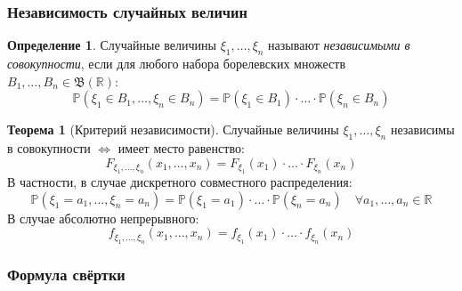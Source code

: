 \documentclass[oneside,final,14pt]{extreport}
\theoremstyle{plain}
\theoremstyle{definition}
\newtheorem*{defn}{Определение}
\theoremstyle{named}
\newtheorem*{namedthm}{Теорема}
\begin{document}
\subsubsection{Независимость случайных величин}
\begin{defn}
    Случайные величины $\xi_1, \ldots, \xi_n$ называют {\it независимыми в совокупности}, если для любого набора борелевских множеств $B_{1}, \ldots, B_{n} \in \mathfrak{B}(\mathbb{R})$:
    \begin{equation*}
        \mathbb{P}\left(\xi_{1} \in B_{1}, \ldots, \xi_{n} \in B_{n}\right)=\mathbb{P}\left(\xi_{1} \in B_{1}\right) \cdot \ldots \cdot \mathbb{P}\left(\xi_{n} \in B_{n}\right)
    \end{equation*}
\end{defn}
\begin{namedthm}[Критерий независимости]
    Случайные величины $\xi_1, \ldots, \xi_n$ независимы в совокупности $\Leftrightarrow$ имеет место равенство:
    \begin{equation*}
        F_{\xi_{1}, \ldots, \xi_{n}}\left(x_{1}, \ldots, x_{n}\right)=F_{\xi_{1}}\left(x_{1}\right) \cdot \ldots \cdot F_{\xi_{n}}\left(x_{n}\right)
    \end{equation*}
    В частности, в случае дискретного совместного распределения:
    \begin{equation*}
        \mathbb{P}\left(\xi_{1}=a_{1}, \ldots, \xi_{n}=a_{n}\right)=\mathbb{P}\left(\xi_{1}=a_{1}\right) \cdot \ldots \cdot \mathbb{P}\left(\xi_{n}=a_{n}\right) \quad \forall a_1, \ldots, a_n \in \mathbb{R}
    \end{equation*}
    В случае абсолютно непрерывного:
    \begin{equation*}
        f_{\xi_{1}, \ldots, \xi_{n}}\left(x_{1}, \ldots, x_{n}\right)=f_{\xi_{1}}\left(x_{1}\right) \cdot \ldots \cdot f_{\xi_{n}}\left(x_{n}\right)
    \end{equation*}
\end{namedthm}

\subsubsection{Формула свёртки}
\end{document}
